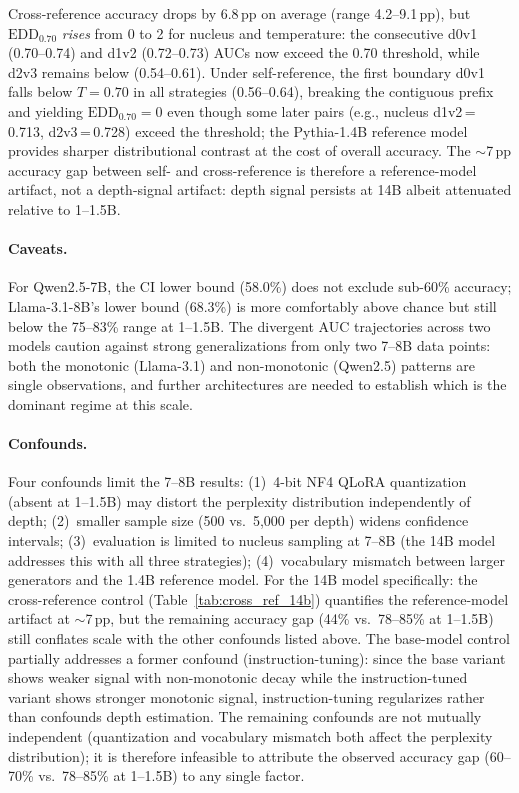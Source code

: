 Cross-reference accuracy drops by 6.8\,pp on average (range 4.2--9.1\,pp), but $\mathrm{EDD}_{0.70}$ \emph{rises} from 0 to 2 for nucleus and temperature: the consecutive d0v1 (0.70--0.74) and d1v2 (0.72--0.73) AUCs now exceed the 0.70 threshold, while d2v3 remains below (0.54--0.61).
Under self-reference, the first boundary d0v1 falls below $T{=}0.70$ in all strategies (0.56--0.64), breaking the contiguous prefix and yielding $\mathrm{EDD}_{0.70}{=}0$ even though some later pairs (e.g., nucleus d1v2\,=\,0.713, d2v3\,=\,0.728) exceed the threshold; the Pythia-1.4B reference model provides sharper distributional contrast at the cost of overall accuracy.
The ${\sim}$7\,pp accuracy gap between self- and cross-reference is therefore a reference-model artifact, not a depth-signal artifact: depth signal persists at 14B albeit attenuated relative to 1--1.5B.

\paragraph{Caveats.}
For Qwen2.5-7B, the CI lower bound (58.0\%) does not exclude sub-60\% accuracy; Llama-3.1-8B's lower bound (68.3\%) is more comfortably above chance but still below the 75--83\% range at 1--1.5B.
The divergent AUC trajectories across two models caution against strong generalizations from only two 7--8B data points: both the monotonic (Llama-3.1) and non-monotonic (Qwen2.5) patterns are single observations, and further architectures are needed to establish which is the dominant regime at this scale.

\paragraph{Confounds.}
\label{app:cross_scale_confounds}
Four confounds limit the 7--8B results: (1)~4-bit NF4 QLoRA quantization (absent at 1--1.5B) may distort the perplexity distribution independently of depth; (2)~smaller sample size (500 vs.\ 5{,}000 per depth) widens confidence intervals; (3)~evaluation is limited to nucleus sampling at 7--8B (the 14B model addresses this with all three strategies); (4)~vocabulary mismatch between larger generators and the 1.4B reference model.
For the 14B model specifically: the cross-reference control (Table~\ref{tab:cross_ref_14b}) quantifies the reference-model artifact at ${\sim}$7\,pp, but the remaining accuracy gap (44\% vs.\ 78--85\% at 1--1.5B) still conflates scale with the other confounds listed above.
The base-model control partially addresses a former confound (instruction-tuning): since the base variant shows weaker signal with non-monotonic decay while the instruction-tuned variant shows stronger monotonic signal, instruction-tuning regularizes rather than confounds depth estimation.
The remaining confounds are not mutually independent (quantization and vocabulary mismatch both affect the perplexity distribution); it is therefore infeasible to attribute the observed accuracy gap (60--70\% vs.\ 78--85\% at 1--1.5B) to any single factor.

